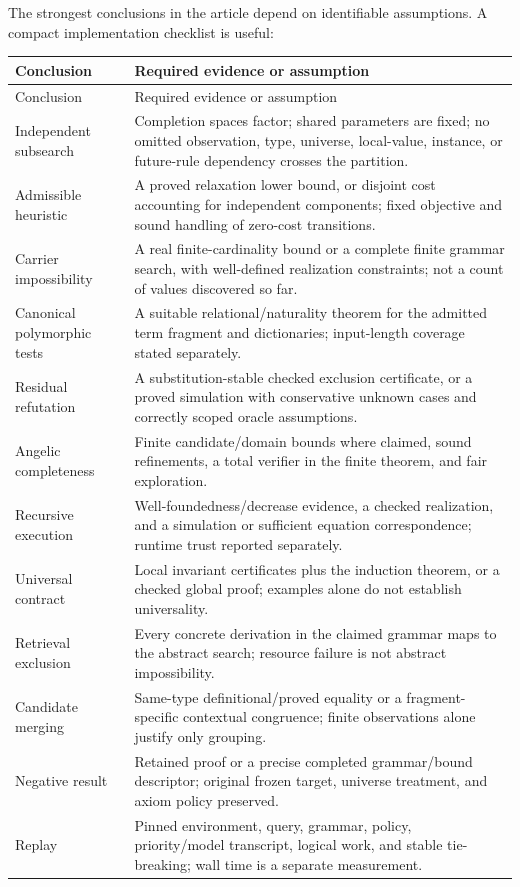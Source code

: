 The strongest conclusions in the article depend on identifiable assumptions. A compact implementation checklist is useful:

\begin{longtable}{@{}L{38mm}L{114mm}@{}}
\toprule
Conclusion & Required evidence or assumption\\
\midrule
\endfirsthead
\toprule
Conclusion & Required evidence or assumption\\
\midrule
\endhead
Independent subsearch & Completion spaces factor; shared parameters are fixed; no omitted observation, type, universe, local-value, instance, or future-rule dependency crosses the partition.\\
Admissible heuristic & A proved relaxation lower bound, or disjoint cost accounting for independent components; fixed objective and sound handling of zero-cost transitions.\\
Carrier impossibility & A real finite-cardinality bound or a complete finite grammar search, with well-defined realization constraints; not a count of values discovered so far.\\
Canonical polymorphic tests & A suitable relational/naturality theorem for the admitted term fragment and dictionaries; input-length coverage stated separately.\\
Residual refutation & A substitution-stable checked exclusion certificate, or a proved simulation with conservative unknown cases and correctly scoped oracle assumptions.\\
Angelic completeness & Finite candidate/domain bounds where claimed, sound refinements, a total verifier in the finite theorem, and fair exploration.\\
Recursive execution & Well-foundedness/decrease evidence, a checked realization, and a simulation or sufficient equation correspondence; runtime trust reported separately.\\
Universal contract & Local invariant certificates plus the induction theorem, or a checked global proof; examples alone do not establish universality.\\
Retrieval exclusion & Every concrete derivation in the claimed grammar maps to the abstract search; resource failure is not abstract impossibility.\\
Candidate merging & Same-type definitional/proved equality or a fragment-specific contextual congruence; finite observations alone justify only grouping.\\
Negative result & Retained proof or a precise completed grammar/bound descriptor; original frozen target, universe treatment, and axiom policy preserved.\\
Replay & Pinned environment, query, grammar, policy, priority/model transcript, logical work, and stable tie-breaking; wall time is a separate measurement.\\
\bottomrule
\end{longtable}


